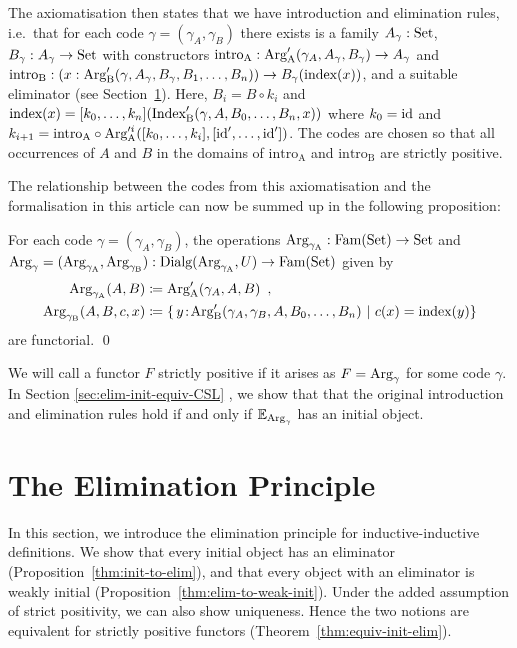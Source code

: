 \documentclass[orivec,envcountsame, ,envcountsect]{llncs}
\begin{document}
The axiomatisation then states that we have introduction and
elimination rules, i.e.\ that for each code $\gamma = (\gamma_A,
\gamma_B)$ there exists is a family $A_\gamma : \text{Set}$, $B_\gamma :
A_\gamma \to \text{Set}$ with constructors $\text{intro}_{\text{A}} :
\text{Arg}_{\text{A}}'(\gamma_A, A_\gamma, B_\gamma) \to A_\gamma$ and
$\text{intro}_{\text{B}} : (x : \text{Arg}_{\text{B}}'(\gamma, A_\gamma, B_\gamma,
B_1, \ldots, B_n)) \to B_\gamma(\text{index}(x))$, and a suitable
eliminator (see Section~\ref{sec:eliminator}). Here, $B_i = B \circ
k_i$ and $\text{index}(x) = [k_0,
  \ldots, k_n](\text{Index}'_{\text{B}}(\gamma, A, B_0, \ldots, B_n, x))$ where $k_0
= \text{id}$ and $k_{i+1} = \text{intro}_{\text{A}} \circ
\text{Arg}_{\text{A}}'^i([k_0, \ldots, k_{i}], [\text{id}',
  \ldots, \text{id}'])$. The codes are chosen so that all occurrences of $A$
and $B$ in the domains of $\text{intro}_{\text{A}}$ and
$\text{intro}_{\text{B}}$ are strictly positive.

The relationship between the codes from this axiomatisation and the formalisation in this article can now be summed up in the following proposition:
\begin{proposition}
  For each code $\gamma = (\gamma_A, \gamma_B)$, the operations $\text{Arg}_{\gamma_\text{A}} : \text{Fam}(\text{Set}) \to \text{Set}$ and $\text{Arg}_{\gamma} = (\text{Arg}_{\gamma_\text{A}}, \text{Arg}_{\gamma_\text{B}}) : \text{Dialg}(\text{Arg}_{\gamma_\text{A}}, U) \to \text{Fam}(\text{Set})$ given by
\begin{align*}
\text{Arg}_{\gamma_\text{A}}(A, B) &\coloneqq \text{Arg}_{\text{A}}'(\gamma_A, A, B) \enspace ,\\
\text{Arg}_{\gamma_\text{B}}(A, B, c, x) &\coloneqq \{\, y\!:\!\text{Arg}_{\text{B}}'(\gamma_A, \gamma_B, A, B_0, \ldots, B_n)
                                                \ |\  c(x) = \text{index}(y) \}
\end{align*}
are functorial. \qed %
\end{proposition}
%
We will call a functor $F$ strictly positive if it arises as $F = \text{Arg}_{\gamma}$ for some code $\gamma$. In Section
\ref{sec:elim-init-equiv-CSL}
, we show that that the original
introduction and elimination rules hold
if and only if $\mathbb{E}_{\text{Arg}_{\gamma}}$ has an initial object.
  

\section{The Elimination Principle}
\label{sec:eliminator}

In this section, we introduce the elimination principle for
inductive-inductive definitions. We show that every initial
object has an eliminator (Proposition~\ref{thm:init-to-elim}), and
that every object with an eliminator is weakly initial
(Proposition~\ref{thm:elim-to-weak-init}). Under the added assumption
of strict positivity, we can also show uniqueness. Hence the two
notions are equivalent for strictly positive functors
(Theorem~\ref{thm:equiv-init-elim}).
\end{document}
